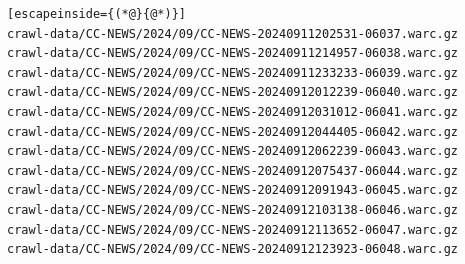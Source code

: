 \begin{lstlisting}[escapeinside={(*@}{@*)}]
crawl-data/CC-NEWS/2024/09/CC-NEWS-20240911202531-06037.warc.gz
crawl-data/CC-NEWS/2024/09/CC-NEWS-20240911214957-06038.warc.gz
crawl-data/CC-NEWS/2024/09/CC-NEWS-20240911233233-06039.warc.gz
crawl-data/CC-NEWS/2024/09/CC-NEWS-20240912012239-06040.warc.gz
crawl-data/CC-NEWS/2024/09/CC-NEWS-20240912031012-06041.warc.gz
crawl-data/CC-NEWS/2024/09/CC-NEWS-20240912044405-06042.warc.gz
crawl-data/CC-NEWS/2024/09/CC-NEWS-20240912062239-06043.warc.gz
crawl-data/CC-NEWS/2024/09/CC-NEWS-20240912075437-06044.warc.gz
crawl-data/CC-NEWS/2024/09/CC-NEWS-20240912091943-06045.warc.gz
crawl-data/CC-NEWS/2024/09/CC-NEWS-20240912103138-06046.warc.gz
crawl-data/CC-NEWS/2024/09/CC-NEWS-20240912113652-06047.warc.gz
crawl-data/CC-NEWS/2024/09/CC-NEWS-20240912123923-06048.warc.gz
\end{lstlisting}

